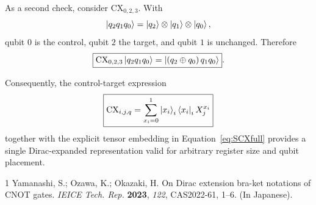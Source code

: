 \documentclass[11pt,a4paper]{article}
\newcommand{\CX}{\mathrm{CX}}
\begin{document}
As a second check, consider $\CX_{0,2,3}$.  With
\begin{equation}
\ket{q_2q_1q_0}=\ket{q_2}\otimes\ket{q_1}\otimes\ket{q_0},
\end{equation}
qubit $0$ is the control, qubit $2$ the target, and qubit $1$ is unchanged.  Therefore
\begin{equation}
\boxed{
\CX_{0,2,3}\ket{q_2q_1q_0}
=
\ket{(q_2\oplus q_0)\,q_1q_0}
}.
\label{eq:SCX02}
\end{equation}

Consequently, the control-target expression
\begin{equation}
\boxed{
\CX_{i,j,q}
=
\sum_{x_i=0}^{1}\ket{x_i}_i\bra{x_i}_i X_j^{x_i}
}
\end{equation}
together with the explicit tensor embedding in Equation~\eqref{eq:SCXfull} provides a single Dirac-expanded representation valid for arbitrary register size and qubit placement.

\begin{thebibliography}{1}
Yamanashi, S.; Ozawa, K.; Okazaki, H. On Dirac extension bra-ket notations of CNOT gates. \emph{IEICE Tech. Rep.} \textbf{2023}, \emph{122}, CAS2022-61, 1--6. (In Japanese).
\end{thebibliography}
\end{document}
